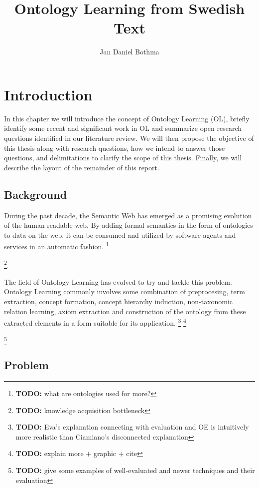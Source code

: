 \documentclass[a4paper]{report}
\title{Ontology Learning from Swedish Text}
\author{Jan Daniel Bothma}
\newcommand{\todo}[1]{\footnote{{\color{red} {\bf TODO:} #1}}}
\begin{document}
\maketitle

\abstract{}

\tableofcontents

\chapter{Introduction}

In this chapter we will introduce the concept of Ontology Learning (OL), briefly identify some recent and significant work in OL and summarize open research questions identified in our literature review.
We will then propose the objective of this thesis along with research questions, how we intend to answer those questions, and delimitations to clarify the scope of this thesis. Finally, we will describe the layout of the remainder of this report.

\section{Background}

During the past decade, the Semantic Web has emerged as a promising evolution of the human readable web. By adding formal semantics in the form of ontologies to data on the web, it can be consumed and utilized by software agents and services in an automatic fashion.
\todo{what are ontologies used for more?}

\todo{knowledge acquisition bottleneck}.

The field of Ontology Learning has evolved to try and tackle this problem.
Ontology Learning commonly involves some combination of preprocesing, term extraction, concept formation, concept hierarchy induction, non-taxonomic relation learning, axiom extraction and construction of the ontology from these extracted elements in a form suitable for its application.
\todo{Eva's explanation connecting with evaluation and OE is intuitively more realistic than Ciamiano's disconnected explanation}
\todo{explain more + graphic + cite}

\todo{give some examples of well-evaluated and newer techniques and their evaluation}

\section{Problem}
\end{document}
